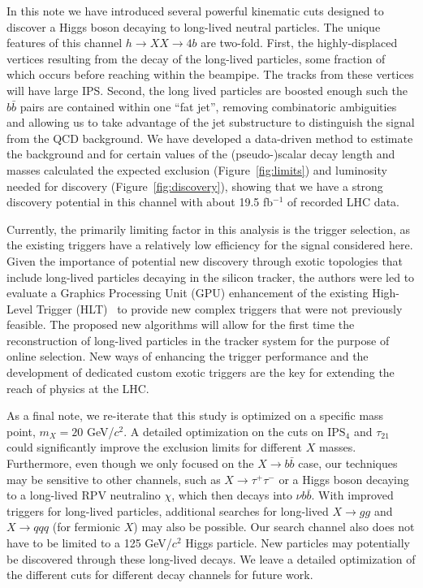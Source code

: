 \documentclass{JHEP3}
\newcommand{\IPS}{\textrm{IPS}}
\begin{document}
In this note we have introduced several powerful kinematic cuts
designed to discover a Higgs boson decaying to long-lived neutral
particles. The unique features of this channel 
 $h \rightarrow XX \rightarrow 4b$ are two-fold.
First, the highly-displaced
vertices resulting from the decay of the long-lived particles,
some fraction of which occurs before reaching within the beampipe.
The tracks from these vertices will have large IPS.
Second, the long lived particles are boosted enough such the $b\bar{b}$ pairs
are contained within one ``fat jet'', removing combinatoric ambiguities and allowing 
us to take advantage of the jet substructure to distinguish the signal from  the QCD background. 
We have developed a data-driven method to estimate the background and 
for certain values of the (pseudo-)scalar decay length and masses calculated the expected exclusion
(Figure~\ref{fig:limits}) and luminosity needed for discovery (Figure~\ref{fig:discovery}), showing that we
have a strong discovery potential in this channel with about 19.5 fb$^{-1}$ of recorded LHC data. 

Currently, the primarily limiting factor in this analysis is the trigger selection, as the existing triggers
have a relatively low efficiency for the signal considered here. Given the importance of potential new
discovery through exotic topologies that include long-lived particles decaying in the silicon tracker, the
authors were led to evaluate a Graphics Processing Unit (GPU) enhancement of the existing High-Level Trigger
(HLT)~\cite{gpu} to provide new complex triggers that were not previously feasible.  The proposed new
algorithms will allow for the first time the reconstruction of long-lived particles in the tracker system for
the purpose of online selection. New ways of enhancing the trigger performance and the development of
dedicated custom exotic triggers are the key for extending the reach of physics at the LHC.

As a final note, we re-iterate that this study is optimized on a specific mass point, $m_X = 20$ GeV/$c^2$. A
detailed optimization on the cuts on $\IPS_4$ and $\tau_{21}$ could significantly improve the exclusion limits
for different $X$ masses. Furthermore, even though we only focused on the $X \rightarrow b\bar{b}$ case, our
techniques may be sensitive to other channels, such as $X\rightarrow \tau^+ \tau^-$ or a Higgs boson decaying to
a long-lived RPV neutralino $\chi$, which then decays into $\nu b\bar{b}$. With improved triggers for long-lived
particles, additional searches for long-lived $X\rightarrow gg$ and $X\rightarrow qqq$ (for fermionic $X$) may
also be possible. Our search channel also does not have to be limited to a 125 GeV/$c^2$ Higgs particle.  New
particles may potentially be discovered through these long-lived decays.  We leave a detailed optimization of
the different cuts for different decay channels for future work.
\end{document}
